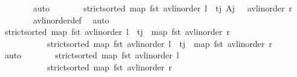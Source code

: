 \begin{isabellebody}
\ \ \ \ \ \ \isamarkupfalse%
\ auto\isanewline
\ \ \ \ \isamarkupfalse%
\ \isamarkupfalse%
\ {\isachardoublequoteopen}strict{\isacharunderscore}{\kern0pt}sorted\ {\isacharparenleft}{\kern0pt}map\ fst\ {\isacharparenleft}{\kern0pt}avl{\isacharunderscore}{\kern0pt}inorder\ l\ {\isacharat}{\kern0pt}\ {\isacharparenleft}{\kern0pt}t\isactrlsub j{\isacharcomma}{\kern0pt}\ A\isactrlsub j{\isacharparenright}{\kern0pt}\ {\isacharhash}{\kern0pt}\ \ avl{\isacharunderscore}{\kern0pt}inorder\ r{\isacharparenright}{\kern0pt}{\isacharparenright}{\kern0pt}{\isachardoublequoteclose}\isanewline
\ \ \ \ \ \ \isamarkupfalse%
\ avl{\isacharunderscore}{\kern0pt}inorder{\isacharunderscore}{\kern0pt}def\ \isamarkupfalse%
\ auto\isanewline
\ \ \ \ \isamarkupfalse%
\ \isamarkupfalse%
\ {\isachardoublequoteopen}strict{\isacharunderscore}{\kern0pt}sorted\ {\isacharparenleft}{\kern0pt}map\ fst\ {\isacharparenleft}{\kern0pt}avl{\isacharunderscore}{\kern0pt}inorder\ l{\isacharparenright}{\kern0pt}\ {\isacharat}{\kern0pt}\ t\isactrlsub j\ {\isacharhash}{\kern0pt}\ map\ fst\ {\isacharparenleft}{\kern0pt}avl{\isacharunderscore}{\kern0pt}inorder\ r{\isacharparenright}{\kern0pt}{\isacharparenright}{\kern0pt}{\isachardoublequoteclose}\isanewline
\ \ \ \ \ \ \ \ \ \ \ {\isachardoublequoteopen}strict{\isacharunderscore}{\kern0pt}sorted\ {\isacharparenleft}{\kern0pt}map\ fst\ {\isacharparenleft}{\kern0pt}avl{\isacharunderscore}{\kern0pt}inorder\ l{\isacharparenright}{\kern0pt}\ {\isacharat}{\kern0pt}\ {\isacharbrackleft}{\kern0pt}t\isactrlsub j{\isacharbrackright}{\kern0pt}\ {\isacharat}{\kern0pt}\ map\ fst\ {\isacharparenleft}{\kern0pt}avl{\isacharunderscore}{\kern0pt}inorder\ r{\isacharparenright}{\kern0pt}{\isacharparenright}{\kern0pt}{\isachardoublequoteclose}\isanewline
\ \ \ \ \ \ \isamarkupfalse%
\ auto\isanewline
\ \ \ \ \isamarkupfalse%
\ \isamarkupfalse%
\ {\isachardoublequoteopen}strict{\isacharunderscore}{\kern0pt}sorted\ {\isacharparenleft}{\kern0pt}map\ fst\ {\isacharparenleft}{\kern0pt}avl{\isacharunderscore}{\kern0pt}inorder\ l{\isacharparenright}{\kern0pt}{\isacharparenright}{\kern0pt}{\isachardoublequoteclose}\ \isanewline
\ \ \ \ \ \ \ \ \ \ \ {\isachardoublequoteopen}strict{\isacharunderscore}{\kern0pt}sorted\ {\isacharparenleft}{\kern0pt}map\ fst\ {\isacharparenleft}{\kern0pt}avl{\isacharunderscore}{\kern0pt}inorder\ r{\isacharparenright}{\kern0pt}{\isacharparenright}{\kern0pt}{\isachardoublequoteclose}\isanewline

\end{isabellebody}

